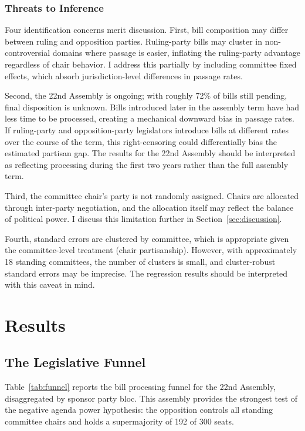 \documentclass[11pt]{article}
\begin{document}
\subsubsection{Threats to Inference}

Four identification concerns merit discussion. First, bill composition may differ between ruling and opposition parties. Ruling-party bills may cluster in non-controversial domains where passage is easier, inflating the ruling-party advantage regardless of chair behavior. I address this partially by including committee fixed effects, which absorb jurisdiction-level differences in passage rates.

Second, the 22nd Assembly is ongoing; with roughly 72\% of bills still pending, final disposition is unknown. Bills introduced later in the assembly term have had less time to be processed, creating a mechanical downward bias in passage rates. If ruling-party and opposition-party legislators introduce bills at different rates over the course of the term, this right-censoring could differentially bias the estimated partisan gap. The results for the 22nd Assembly should be interpreted as reflecting processing during the first two years rather than the full assembly term.

Third, the committee chair's party is not randomly assigned. Chairs are allocated through inter-party negotiation, and the allocation itself may reflect the balance of political power. I discuss this limitation further in Section~\ref{sec:discussion}.

Fourth, standard errors are clustered by committee, which is appropriate given the committee-level treatment (chair partisanship). However, with approximately 18 standing committees, the number of clusters is small, and cluster-robust standard errors may be imprecise. The regression results should be interpreted with this caveat in mind.


\section{Results}
\label{sec:results}

\subsection{The Legislative Funnel}

Table~\ref{tab:funnel} reports the bill processing funnel for the 22nd Assembly, disaggregated by sponsor party bloc. This assembly provides the strongest test of the negative agenda power hypothesis: the opposition controls all standing committee chairs and holds a supermajority of 192 of 300 seats.
\end{document}
